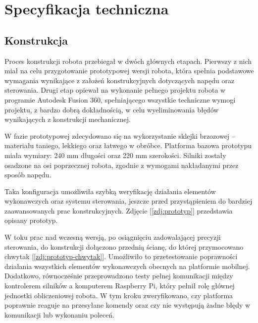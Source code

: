\chapter{Specyfikacja techniczna}
\label{ch:06}

\section{Konstrukcja}
Proces konstrukcji robota przebiegał w dwóch głównych etapach. Pierwszy z nich miał na celu przygotowanie prototypowej wersji robota, która spełnia podstawowe wymagania wynikające z założeń konstrukcyjnych dotyczących napędu oraz sterowania. Drugi etap opiewał na wykonanie pełnego projektu robota w programie Autodesk Fusion 360, spełniającego wszystkie techniczne wymogi projektu, z bardzo dobrą dokładnością, w celu wyeliminowania błędów wynikających z konstrukcji mechanicznej.

W fazie prototypowej zdecydowano się na wykorzystanie sklejki brzozowej – materiału taniego, lekkiego oraz łatwego w obróbce. Platforma bazowa prototypu miała wymiary: 240 mm długości oraz 220 mm szerokości. Silniki zostały osadzone na osi poprzecznej robota, zgodnie z wymogami nakładanymi przez sposób napędu. 

Taka konfiguracja umożliwiła szybką weryfikację działania elementów wykonawczych oraz systemu sterowania, jeszcze przed przystąpieniem do bardziej zaawansowanych prac konstrukcyjnych. Zdjęcie [\ref{zdj:prototyp}] przedstawia opisany prototyp. 

\hspace{1cm}

W toku prac nad wczesną wersją, po osiągnięciu zadowalającej precyzji sterowania, do konstrukcji dołączono przednią ścianę, do której przymocowano chwytak [\ref{zdj:prototyp-chwytak}]. Umożliwiło to przetestowanie poprawności działania wszystkich elementów wykonawczych obecnych na platformie mobilnej. Dodatkowo, równocześnie przeprowadzono testy pełnej komunikacji między kontrolerem silników a komputerem Raspberry Pi, który pełnił rolę głównej jednostki obliczeniowej robota. W tym kroku zweryfikowano, czy platforma poprawnie reaguje na przesyłane komendy oraz czy nie występują żadne błędy w komunikacji lub wykonaniu poleceń.

